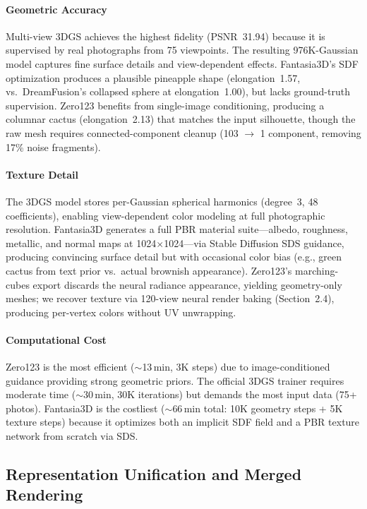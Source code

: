 \documentclass[10pt,twocolumn,letterpaper]{article}
\begin{document}
\paragraph{Geometric Accuracy} Multi-view 3DGS achieves the highest fidelity (PSNR~31.94) because it is supervised by real photographs from 75 viewpoints. The resulting 976K-Gaussian model captures fine surface details and view-dependent effects. Fantasia3D's SDF optimization produces a plausible pineapple shape (elongation~1.57, vs.\ DreamFusion's collapsed sphere at elongation~1.00), but lacks ground-truth supervision. Zero123 benefits from single-image conditioning, producing a columnar cactus (elongation~2.13) that matches the input silhouette, though the raw mesh requires connected-component cleanup (103 $\rightarrow$ 1 component, removing 17\% noise fragments).

\paragraph{Texture Detail} The 3DGS model stores per-Gaussian spherical harmonics (degree~3, 48 coefficients), enabling view-dependent color modeling at full photographic resolution. Fantasia3D generates a full PBR material suite---albedo, roughness, metallic, and normal maps at 1024$\times$1024---via Stable Diffusion SDS guidance, producing convincing surface detail but with occasional color bias (e.g., green cactus from text prior vs.\ actual brownish appearance). Zero123's marching-cubes export discards the neural radiance appearance, yielding geometry-only meshes; we recover texture via 120-view neural render baking (Section~2.4), producing per-vertex colors without UV unwrapping.

\paragraph{Computational Cost} Zero123 is the most efficient ($\sim$13\,min, 3K steps) due to image-conditioned guidance providing strong geometric priors. The official 3DGS trainer requires moderate time ($\sim$30\,min, 30K iterations) but demands the most input data (75+ photos). Fantasia3D is the costliest ($\sim$66\,min total: 10K geometry steps + 5K texture steps) because it optimizes both an implicit SDF field and a PBR texture network from scratch via SDS.

\subsection{Representation Unification and Merged Rendering}
\end{document}
